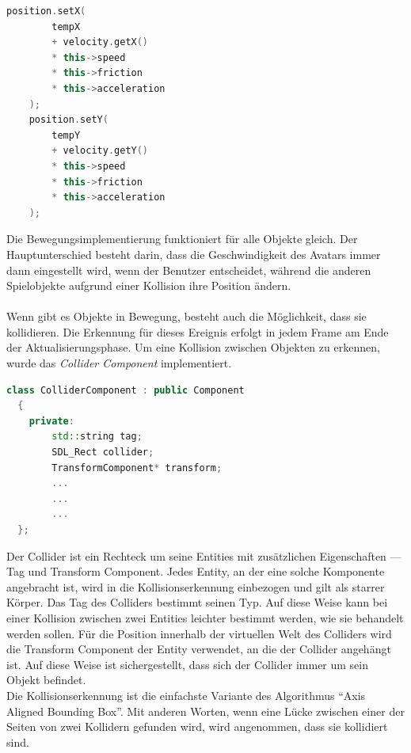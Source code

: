 \documentclass[
  10pt,
  a4paper,
  oneside,
  headers,
  headinclude,
  footinclude,
  BCOR5mm,
]{article}
\begin{document}
\begin{lstlisting}[language=C++]
    position.setX(
        tempX
        + velocity.getX()
        * this->speed
        * this->friction
        * this->acceleration
    );
    position.setY(
        tempY
        + velocity.getY()
        * this->speed
        * this->friction
        * this->acceleration
    );
\end{lstlisting}

Die Bewegungsimplementierung funktioniert für alle Objekte gleich. Der
Hauptunterschied besteht darin, dass die Geschwindigkeit des Avatars immer dann
eingestellt wird, wenn der Benutzer entscheidet, während die anderen
Spielobjekte aufgrund einer Kollision ihre Position ändern.\\

\paragraph{}
Wenn gibt es Objekte in Bewegung, besteht auch die Möglichkeit, dass sie
kollidieren. Die Erkennung für dieses Ereignis erfolgt in jedem Frame am Ende
der Aktualisierungsphase. Um eine Kollision zwischen Objekten zu erkennen, wurde
das \textit{Collider Component} implementiert.

\begin{lstlisting}[language=C++]
  class ColliderComponent : public Component
  {
    private:
        std::string tag;
        SDL_Rect collider;
        TransformComponent* transform;
        ...
        ...
        ...
  };
\end{lstlisting}

Der Collider ist ein Rechteck um seine Entities mit zusätzlichen Eigenschaften
--- Tag und Transform Component. Jedes Entity, an der eine solche Komponente
angebracht ist, wird in die Kollisionserkennung einbezogen und gilt als starrer
Körper. Das Tag des Colliders bestimmt seinen Typ. Auf diese Weise kann bei
einer Kollision zwischen zwei Entities leichter bestimmt werden, wie sie
behandelt werden sollen. Für die Position innerhalb der virtuellen Welt des
Colliders wird die Transform Component der Entity verwendet, an die der Collider
angehängt ist. Auf diese Weise ist sichergestellt, dass sich der Collider immer
um sein Objekt befindet. \\
Die Kollisionserkennung ist die einfachste Variante des Algorithmus ``Axis
Aligned Bounding Box''. Mit anderen Worten, wenn eine Lücke zwischen einer der
Seiten von zwei Kollidern gefunden wird, wird angenommen, dass sie kollidiert
sind.
\end{document}
